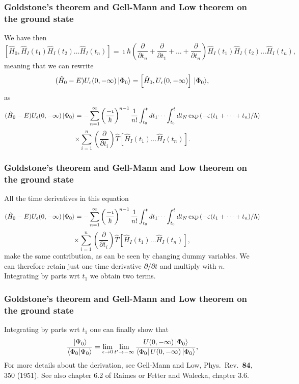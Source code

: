 \frame
{
\frametitle{Goldstone's theorem and Gell-Mann and Low theorem on the ground state}
\begin{small}
{\scriptsize
We have then
\[
\left[\hat{H}_0,\hat{H}_I(t_1)\hat{H}_I(t_2)\dots \hat{H}_I(t_n)\right]=\imath \hbar\left(\frac{\partial }{\partial t_n}+\frac{\partial }{\partial t_1}+\dots+\frac{\partial }{\partial t_n}\right) \hat{H}_I(t_1)\hat{H}_I(t_2)\dots\hat{H}_I(t_n),
\]
meaning that we can rewrite
\[
(\hat{H}_0-E)U_{\epsilon }(0,-\infty )\,|{\Phi_0}\rangle=\left[\hat{H}_0,U_{\epsilon }(0,-\infty )\right]\,|{\Phi_0}\rangle,
\]
as
\[
(\hat{H}_0-E)U_{\epsilon }(0,-\infty )\,|{\Phi_0}\rangle=-\sum_{n=1}^{\infty}\left(\frac{-\imath}{\hbar}\right)^{n-1}\frac{1}{n!}
\int_{t_0}^t dt_1\dots \int_{t_0}^t dt_N \exp{(-\varepsilon(t_1+\dots+t_n)/\hbar)}
\]
\[
\times\sum_{i=1}^n(\frac{\partial }{\partial t_i} )\hat{T}\left[\hat{H}_I(t_1)\dots\hat{H}_I(t_n)\right].
\]
}
\end{small}
}

\frame
{
\frametitle{Goldstone's theorem and Gell-Mann and Low theorem on the ground state}
\begin{small}
{\scriptsize
All the time derivatives in this equation 
\[
(\hat{H}_0-E)U_{\epsilon }(0,-\infty )\,|{\Phi_0}\rangle=-\sum_{n=1}^{\infty}\left(\frac{-\imath}{\hbar}\right)^{n-1}\frac{1}{n!}
\int_{t_0}^t dt_1\dots \int_{t_0}^t dt_N \exp{(-\varepsilon(t_1+\dots+t_n)/\hbar)}
\]
\[
\times\sum_{i=1}^n(\frac{\partial }{\partial t_i} )\hat{T}\left[\hat{H}_I(t_1)\dots\hat{H}_I(t_n)\right],
\]
make the same contribution, as can be seen by changing dummy variables. We can therefore retain just one time derivative $\partial/\partial t$ and multiply with $n$. Integrating by parts wrt $t_1$  we obtain two terms. 
}
\end{small}
}


\frame
{
\frametitle{Goldstone's theorem and Gell-Mann and Low theorem on the ground state}
\begin{small}
{\scriptsize
Integrating by parts wrt $t_1$  one can finally show that
\[
        \frac{\,|{\Psi_0}\rangle}{\left\langle\Phi_0 | \Psi_0 \right\rangle}=
    \lim_{\epsilon \rightarrow 0}
   \lim_{t'\rightarrow -\infty}
   \frac{U(0,-\infty )\,|{\Phi_0}\rangle }
   { \bra{\Phi_0} U(0,-\infty )\,|{\Phi_0}\rangle },
\]
For more details about the derivation, see Gell-Mann and Low, Phys.~Rev.~{\bf 84}, 350  (1951). See also chapter 6.2 of Raimes or Fetter and Walecka, chapter 3.6.
}
\end{small}
}


